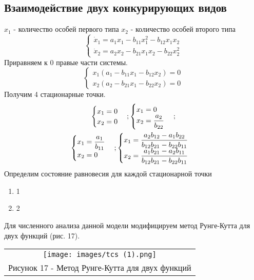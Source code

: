 \subsection{Взаимодействие двух конкурирующих видов}
$x_1$ - количество особей первого типа
$x_2$ - количество особей второго типа
\begin{equation}
  \begin{cases}
    \dot{x}_1=a_1x_1-b_{11}x_1^2-b_{12}x_1x_2\\
    \dot{x}_2=a_2x_2-b_{21}x_1x_2-b_{22}x_2^2
  \end{cases}
\end{equation}
Приравняем к 0 правые части системы.
\begin{equation}
  \begin{cases}
    x_1(a_1-b_{11}x_1-b_{12}x_2)=0\\
    x_2(a_2-b_{21}x_1-b_{22}x_2)=0
  \end{cases}
\end{equation}
Получим 4 стационарные точки.
\begin{gather}
  \begin{cases}
    x_1=0\\
    x_2=0
  \end{cases};
  \begin{cases}
    x_1=0\\
    x_2=\dfrac{a_2}{b_{22}}
  \end{cases};\\
  \begin{cases}
    x_1=\dfrac{a_1}{b_{11}}\\
    x_2=0
  \end{cases};
  \begin{cases}
    x_1=\dfrac{a_2b_{12}-a_1b_{22}}{b_{12}b_{21}-b_{22}b_{11}}\\
    x_2=\dfrac{a_1b_{21}-a_2b_{11}}{b_{12}b_{21}-b_{22}b_{11}}
  \end{cases}\notag
\end{gather}
Определим состояние равновесия для каждой стационарной точки
\begin{enumerate}
  \item 1
  \item 2
\end{enumerate}
Для численного анализа данной модели модифицируем метод Рунге-Кутта для двух функций (рис. 17).
\begin{center}
  \begin{tabular}{c}
    \texttt{[image: images/tcs (1).png]}\\
    Рисунок 17 - Метод Рунге-Кутта для двух функций
  \end{tabular}
\end{center}
